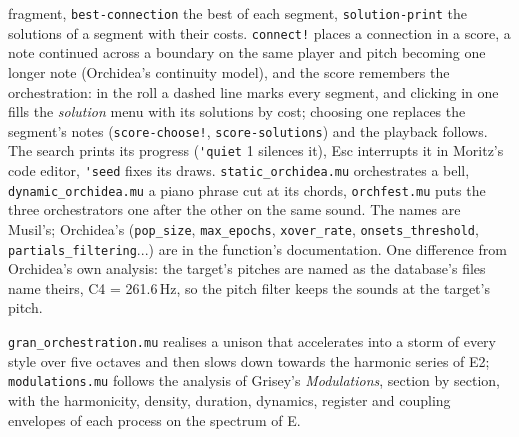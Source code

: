 \documentclass[11pt,a4paper]{article}
\newcommand{\musil}[1]{\lstinline[style=musilinline]{#1}}
\begin{document}
fragment, \musil{best-connection} the best of each segment, \musil{solution-print} the
solutions of a segment with their costs. \musil{connect!} places a connection in a score, a
note continued across a boundary on the same player and pitch becoming one longer note
(Orchidea's continuity model), and the score remembers the orchestration: in the roll a
dashed line marks every segment, and clicking in one fills the \emph{solution} menu with its
solutions by cost; choosing one replaces the segment's notes (\musil{score-choose!},
\musil{score-solutions}) and the playback follows. The search prints its progress
(\musil{'quiet} 1 silences it), Esc interrupts it in Moritz's code editor, \musil{'seed} fixes its draws.
\texttt{static\_orchidea.mu} orchestrates a bell, \texttt{dynamic\_orchidea.mu} a piano
phrase cut at its chords, \texttt{orchfest.mu} puts the three orchestrators one after the
other on the same sound. The names are Musil's; Orchidea's (\texttt{pop\_size},
\texttt{max\_epochs}, \texttt{xover\_rate}, \texttt{onsets\_threshold},
\texttt{partials\_filtering}...) are in the function's documentation. One difference from
Orchidea's own analysis: the target's pitches are named as the database's files name theirs,
C4 = 261.6\,Hz, so the pitch filter keeps the sounds at the target's pitch.

\texttt{gran\_orchestration.mu} realises a unison that accelerates into a storm of every
style over five octaves and then slows down towards the harmonic series of E2;
\texttt{modulations.mu} follows the analysis of Grisey's \emph{Modulations}, section by
section, with the harmonicity, density, duration, dynamics, register and coupling envelopes
of each process on the spectrum of E.
\end{document}
